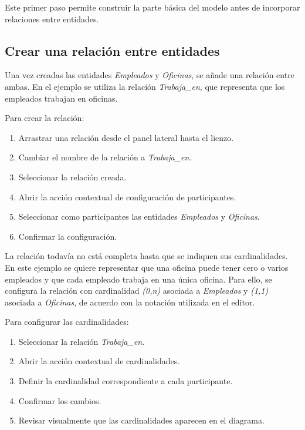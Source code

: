 
Este primer paso permite construir la parte básica del modelo antes de incorporar relaciones entre entidades.

\subsection{Crear una relación entre entidades}

Una vez creadas las entidades \textit{Empleados} y \textit{Oficinas}, se añade una relación entre ambas. En el ejemplo se utiliza la relación \textit{Trabaja\_en}, que representa que los empleados trabajan en oficinas.

Para crear la relación:

\begin{enumerate}
    \item Arrastrar una relación desde el panel lateral hasta el lienzo.
    \item Cambiar el nombre de la relación a \textit{Trabaja\_en}.
    \item Seleccionar la relación creada.
    \item Abrir la acción contextual de configuración de participantes.
    \item Seleccionar como participantes las entidades \textit{Empleados} y \textit{Oficinas}.
    \item Confirmar la configuración.
\end{enumerate}


La relación todavía no está completa hasta que se indiquen sus cardinalidades. En este ejemplo se quiere representar que una oficina puede tener cero o varios empleados y que cada empleado trabaja en una única oficina. Para ello, se configura la relación con cardinalidad \textit{(0,n)} asociada a \textit{Empleados} y \textit{(1,1)} asociada a \textit{Oficinas}, de acuerdo con la notación utilizada en el editor.

Para configurar las cardinalidades:

\begin{enumerate}
    \item Seleccionar la relación \textit{Trabaja\_en}.
    \item Abrir la acción contextual de cardinalidades.
    \item Definir la cardinalidad correspondiente a cada participante.
    \item Confirmar los cambios.
    \item Revisar visualmente que las cardinalidades aparecen en el diagrama.
\end{enumerate}

